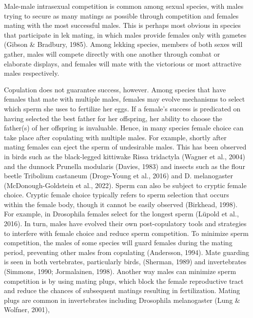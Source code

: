 \documentclass[
  11pt,
]{article}
\begin{document}
\par

Male-male intrasexual competition is common among sexual species, with
males trying to secure as many matings as possible through competition
and females mating with the most successful males. This is perhaps most
obvious in species that participate in lek mating, in which males
provide females only with gametes (Gibson \& Bradbury, 1985). Among
lekking species, members of both sexes will gather, males will compete
directly with one another through combat or elaborate displays, and
females will mate with the victorious or most attractive males
respectively.

\par

Copulation does not guarantee success, however. Among species that have
females that mate with multiple males, females may evolve mechanisms to
select which sperm she uses to fertilize her eggs. If a female's success
is predicated on having selected the best father for her offspring, her
ability to choose the father(s) of her offspring is invaluable. Hence,
in many species female choice can take place after copulating with
multiple males. For example, shortly after mating females can eject the
sperm of undesirable males. This has been observed in birds such as the
black-legged kittiwake Rissa tridactyla (Wagner et al., 2004) and the
dunnock Prunella modularis (Davies, 1983) and insects such as the flour
beetle Tribolium castaneum (Droge-Young et al., 2016) and D.
melanogaster (McDonough-Goldstein et al., 2022). Sperm can also be
subject to cryptic female choice. Cryptic female choice typically refers
to sperm selection that occurs within the female body, though it cannot
be easily observed (Birkhead, 1998). For example, in Drosophila females
select for the longest sperm (Lüpold et al., 2016). In turn, males have
evolved their own post-copulatory tools and strategies to interfere with
female choice and reduce sperm competition. To minimize sperm
competition, the males of some species will guard females during the
mating period, preventing other males from copulating (Andersson, 1994).
Mate guarding is seen in both vertebrates, particularly birds, (Sherman,
1989) and invertebrates (Simmons, 1990; Jormalainen, 1998). Another way
males can minimize sperm competition is by using mating plugs, which
block the female reproductive tract and reduce the chances of subsequent
matings resulting in fertilization. Mating plugs are common in
invertebrates including Drosophila melanogaster (Lung \& Wolfner, 2001),
\end{document}
